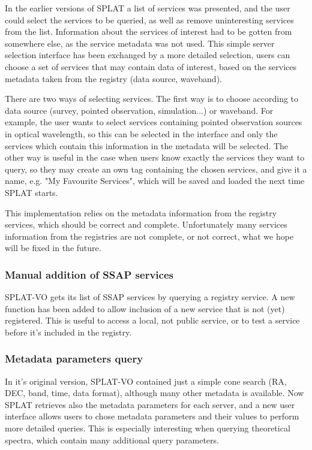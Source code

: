 \documentclass[final,authoryear,5p,times,twocolumn]{elsarticle}
\begin{document}
In the earlier versions of SPLAT a list of services was presented, and
the user could select the services to be queried, as well as remove
uninteresting services from the list. Information about the services
of interest had to be gotten from somewhere else, as the service
metadata was not used.  This simple server selection interface has
been exchanged by a more detailed selection, users can choose a set of
services that may contain data of interest, based on the services
metadata taken from the registry (data source, waveband).

There are two ways of selecting services. The first way is to choose
according to data source (survey, pointed observation, simulation...)
or waveband.  For example, the user wants to select services
containing pointed observation sources in optical wavelength, so this
can be selected in the interface and only the services which contain
this information in the metadata will be selected.  The other way is
useful in the case when users know exactly the services they want to
query, so they may create an own tag containing the chosen services,
and give it a name, e.g. "My Favourite Services", which will be saved
and loaded the next time SPLAT starts.

This implementation relies on the metadata information from the
registry services, which should be correct and complete. Unfortunately
many services information from the registries are not complete, or not
correct, what we hope will be fixed in the future.



\subsubsection{Manual addition of SSAP services}

SPLAT-VO gets its list of SSAP services by querying a registry
service.  A new function has been added to allow inclusion of a new
service that is not (yet) registered. This is useful to access a
local, not public service, or to test a service before it's included
in the registry.

\subsubsection{Metadata parameters query}

In it's original version, SPLAT-VO contained just a simple cone search
(RA, DEC, band, time, data format), although many other metadata is
available.  Now SPLAT retrieves also the metadata parameters for each
server, and a new user interface allows users to chose metadata
parameters and their values to perform more detailed queries.  This is
especially interesting when querying theoretical spectra, which
contain many additional query parameters.
\end{document}
